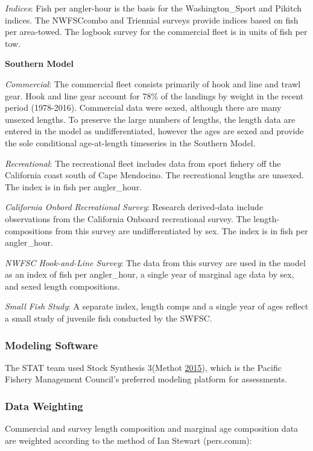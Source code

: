 \documentclass[12pt,]{article}
\begin{document}
\emph{Indices}: Fish per angler-hour is the basis for the
Washington\_Sport and Pikitch indices. The NWFSCcombo and Triennial
surveys provide indices based on fish per area-towed. The logbook survey
for the commercial fleet is in units of fish per tow.

\textbf{Southern Model}

\emph{Commercial}: The commercial fleet consists primarily of hook and
line and trawl gear. Hook and line gear account for 78\% of the landings
by weight in the recent period (1978-2016). Commercial data were sexed,
although there are many unsexed lengths. To preserve the large numbers
of lengths, the length data are entered in the model as
undifferentiated, however the ages are sexed and provide the sole
conditional age-at-length timeseries in the Southern Model.

\emph{Recreational}: The recreational fleet includes data from sport
fishery off the California coast south of Cape Mendocino. The
recreational lengths are unsexed. The index is in fish per angler\_hour.

\emph{California Onbord Recreational Survey}: Research derived-data
include observations from the California Onboard recreational survey.
The length-compositions from this survey are undifferentiated by sex.
The index is in fish per angler\_hour.

\emph{NWFSC Hook-and-Line Survey}: The data from this survey are used in
the model as an index of fish per angler\_hour, a single year of
marginal age data by sex, and sexed length compositions.

\emph{Small Fish Study}: A separate index, length comps and a single
year of ages reflect a small study of juvenile fish conducted by the
SWFSC.

\subsubsection{Modeling Software}\label{modeling-software}

The STAT team used Stock Synthesis 3(Methot
\protect\hyperlink{ref-Methot2015}{2015}), which is the Pacific Fishery
Management Council's preferred modeling platform for assessments.

\subsubsection{Data Weighting}\label{data-weighting}

Commercial and survey length composition and marginal age composition
data are weighted according to the method of Ian Stewart (pers.comm):
\end{document}
